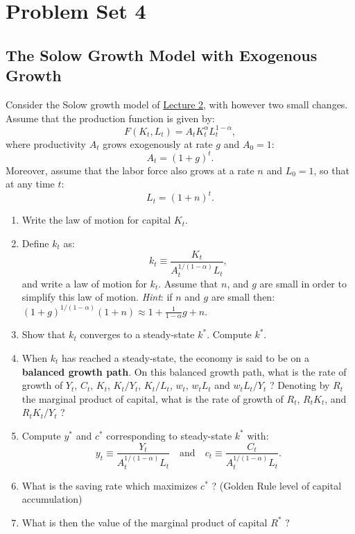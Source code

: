 \documentclass[]{book}
\theoremstyle{definition}
\theoremstyle{definition}
\theoremstyle{definition}
\theoremstyle{remark}
\begin{document}
\hypertarget{pset4}{\chapter{Problem Set 4}\label{pset4}}

\section{The Solow Growth Model with Exogenous
Growth}\label{the-solow-growth-model-with-exogenous-growth}

Consider the Solow growth model of \protect\hyperlink{solow}{Lecture 2},
with however two small changes. Assume that the production function is
given by: \[F(K_t,L_t)=A_t K_t^{\alpha} L_t^{1-\alpha},\] where
productivity \(A_t\) grows exogenously at rate \(g\) and \(A_0=1\):
\[A_t=(1+g)^t.\] Moreover, assume that the labor force also grows at a
rate \(n\) and \(L_0=1\), so that at any time \(t\): \[ L_t = (1+n)^t.\]

\begin{enumerate}
\def\labelenumi{\arabic{enumi}.}
\item
  Write the law of motion for capital \(K_t\).
\item
  Define \(k_t\) as: \[ k_t\equiv\frac{K_t}{A_t^{1/(1-\alpha)} L_t},\]
  and write a law of motion for \(k_t\). Assume that \(n\), and \(g\)
  are small in order to simplify this law of motion. \emph{Hint}: if
  \(n\) and \(g\) are small then:
  \((1+g)^{1/(1-\alpha)}(1+n) \approx 1+\frac{1}{1-\alpha}g+n.\)
\item
  Show that \(k_t\) converges to a steady-state \(k^{*}\). Compute
  \(k^{*}\).
\item
  When \(k_t\) has reached a steady-state, the economy is said to be on
  a \textbf{balanced growth path}. On this balanced growth path, what is
  the rate of growth of \(Y_t\), \(C_t\), \(K_t\), \(K_t/Y_t\),
  \(K_t/L_t\), \(w_t\), \(w_t L_t\) and \(w_t L_t/Y_t\) ? Denoting by
  \(R_t\) the marginal product of capital, what is the rate of growth of
  \(R_t\), \(R_t K_t\), and \(R_t K_t/Y_t\) ?
\item
  Compute \(y^{*}\) and \(c^{*}\) corresponding to steady-state
  \(k^{*}\) with:
  \[y_t \equiv \frac{Y_t}{A_t^{1/(1-\alpha)} L_t} \quad \text{and} \quad c_t \equiv \frac{C_t}{A_t^{1/(1-\alpha)} L_t}.\]
\item
  What is the saving rate which maximizes \(c^{*}\) ? (Golden Rule level
  of capital accumulation)
\item
  What is then the value of the marginal product of capital \(R^{*}\) ?
\end{enumerate}
\end{document}
